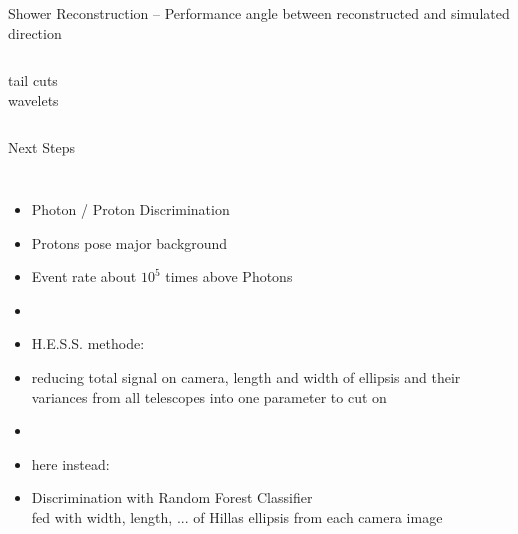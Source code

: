 \documentclass[8pt]{beamer}
\newlength{\figureheight}
\begin{document}
    \begin{frame}{Shower Reconstruction -- Performance}
                 {angle between reconstructed and simulated direction}
        \setlength{\figureheight}{6cm}
        \begin{columns}
                \centering
                tail cuts\\
                
                \centering
                wavelets\\                
                
                
        \end{columns}

    \end{frame}

    

    \begin{frame}{Next Steps}
        \begin{columns}

                \begin{itemize}
                    \item [] Photon / Proton Discrimination
                    \item Protons pose major background
                    \item Event rate about $10^5$ times above Photons
                    \item[]
                    \item[] H.E.S.S. methode:
                    \item reducing total signal on camera, length and width
                        of ellipsis and their variances from all telescopes
                        into one parameter to cut on
                    \item[]
                    \item[] here instead:
                    \item Discrimination with Random Forest Classifier\\
                        fed with width, length, ... of Hillas ellipsis
                        from each camera image
                \end{itemize}
                \centering
        \end{columns}
    \end{frame}
    
\end{document}
